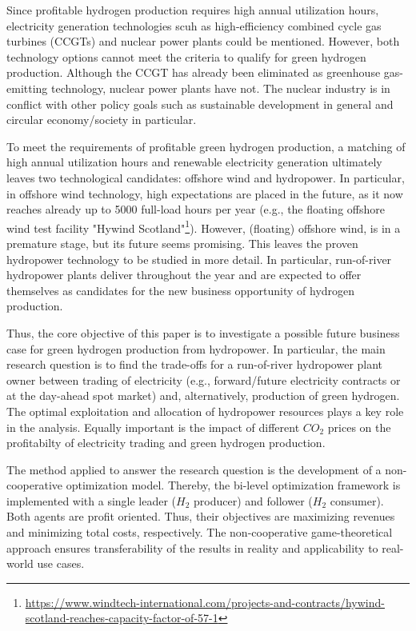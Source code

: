 \documentclass[review]{elsarticle}
\begin{document}
Since profitable hydrogen production requires high annual utilization hours, electricity generation technologies scuh as high-efficiency combined cycle gas turbines (CCGTs) and nuclear power plants could be mentioned. However, both technology options cannot meet the criteria to qualify for green hydrogen production. Although the CCGT has already been eliminated as greenhouse gas-emitting technology, nuclear power plants have not. The nuclear industry is in conflict with other policy goals such as sustainable development in general and circular economy/society in particular.\vspace{0.3cm}

To meet the requirements of profitable green hydrogen production, a matching of high annual utilization hours and renewable electricity generation ultimately leaves two technological candidates: offshore wind and hydropower. In particular, in offshore wind technology, high expectations are placed in the future, as it now reaches already up to \SI{5000}{} full-load hours per year (e.g., the floating offshore wind test facility "Hywind Scotland"\footnote{\url{https://www.windtech-international.com/projects-and-contracts/hywind-scotland-reaches-capacity-factor-of-57-1}}). However, (floating) offshore wind, is in a premature stage, but its future seems promising. This leaves the proven hydropower technology to be studied in more detail. In particular, run-of-river hydropower plants deliver throughout the year and are expected to offer themselves as candidates for the new business opportunity of hydrogen production.\vspace{0.3cm}

Thus, the core objective of this paper is to investigate a possible future business case for green hydrogen production from hydropower. In particular, the main research question is to find the trade-offs for a run-of-river hydropower plant owner between trading of electricity (e.g., forward/future electricity contracts or at the day-ahead spot market) and, alternatively, production of green hydrogen. The optimal exploitation and allocation of hydropower resources plays a key role in the analysis. Equally important is the impact of different $CO_2$ prices on the profitabilty of electricity trading and green hydrogen production.\vspace{0.3cm} 

The method applied to answer the research question is the development of a non-cooperative optimization model. Thereby, the bi-level optimization framework is implemented with a single leader ($H_2$ producer) and follower ($H_2$ consumer). Both agents are profit oriented. Thus, their objectives are maximizing revenues and minimizing total costs, respectively. The non-cooperative game-theoretical approach ensures transferability of the results in reality and applicability to real-world use cases.\vspace{0.3cm} 
\end{document}
